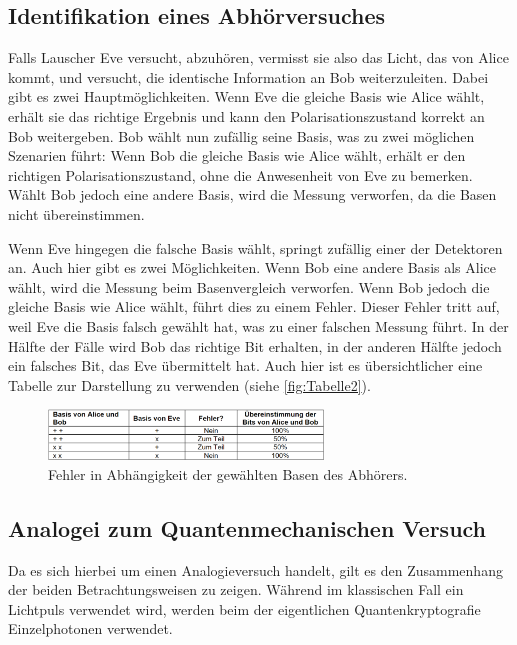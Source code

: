 \subsection{Identifikation eines Abhörversuches}

Falls Lauscher Eve versucht, abzuhören, vermisst sie also das Licht, das von Alice kommt, und versucht, die identische Information an Bob weiterzuleiten. Dabei gibt es zwei Hauptmöglichkeiten. Wenn Eve die gleiche Basis wie Alice wählt, erhält sie das richtige Ergebnis und kann den Polarisationszustand korrekt an Bob weitergeben. Bob wählt nun zufällig seine Basis, was zu zwei möglichen Szenarien führt: Wenn Bob die gleiche Basis wie Alice wählt, erhält er den richtigen Polarisationszustand, ohne die Anwesenheit von Eve zu bemerken. Wählt Bob jedoch eine andere Basis, wird die Messung verworfen, da die Basen nicht übereinstimmen.

Wenn Eve hingegen die falsche Basis wählt, springt zufällig einer der Detektoren an. Auch hier gibt es zwei Möglichkeiten. Wenn Bob eine andere Basis als Alice wählt, wird die Messung beim Basenvergleich verworfen. Wenn Bob jedoch die gleiche Basis wie Alice wählt, führt dies zu einem Fehler. Dieser Fehler tritt auf, weil Eve die Basis falsch gewählt hat, was zu einer falschen Messung führt. In der Hälfte der Fälle wird Bob das richtige Bit erhalten, in der anderen Hälfte jedoch ein falsches Bit, das Eve übermittelt hat.
Auch hier ist es übersichtlicher eine Tabelle zur Darstellung zu verwenden (siehe \autoref{fig:Tabelle2}).
\begin{figure}[H]
	\centering
	\includegraphics[width=0.65\textwidth]{content/grafik/Tabelle2.png}
	\caption{Fehler in Abhängigkeit der gewählten Basen des Abhörers. \cite{krypt}}
	\label{fig:Tabelle2}
\end{figure}

\subsection{Analogei zum Quantenmechanischen Versuch}
Da es sich hierbei um einen Analogieversuch handelt, gilt es den Zusammenhang der beiden Betrachtungsweisen zu zeigen. Während im klassischen Fall ein Lichtpuls verwendet wird, werden beim der eigentlichen Quantenkryptografie Einzelphotonen verwendet.
